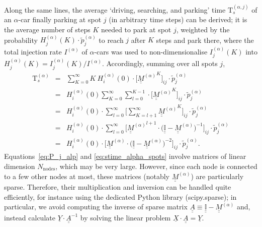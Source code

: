 \documentclass[trsc,reprint]{informs3}
\newcommand{\ul}[1]{\underline{#1}}
\newcommand{\uul}[1]{\underline{\underline{#1}}}
\newcommand{\alp}{^{(\alpha)}}
\newcommand{\Ma}{ {\uul{M}\alp}}
\newcommand{\Tk}{\mathrm{T}_s}
\newcommand{\AN}[1]{#1}
\begin{document}
Along the same lines, the average `driving, searching, and parking' time $\Tk^{(\alpha,j)}$ of an $\alpha$-car finally parking at spot $j$ (in arbitrary time steps) can be derived; it is the average number of steps $K$ needed to park at spot $j$, weighted by the probability $H\alp_j(K)\cdot \tilde{p}\alp_j$ to reach $j$ after $K$ steps and park there, where 
the total injection rate $I\alp$ of $\alpha$-cars was used to non-dimensionalise $I\alp_j(K)$ into $H\alp_j(K)= I\alp_j(K)/I\alp$. Accordingly, summing over all spots $j$,
\begin{eqnarray}
    \Tk^{(\alpha)} & = &\sum_{K=0}^{\infty}  K\ H_i\alp(0) \cdot \Big[\Ma^K\Big]_{ij}\cdot  \tilde{p}\alp_j \nonumber \\
                     & = & H_i\alp(0) \sum_{K=0}^{\infty}  \sum_{l=0}^{K-1}  \cdot \Big[\Ma^K\Big]_{ij}\cdot  \tilde{p}\alp_j \nonumber \\
                     & = & H_i\alp(0) \cdot \sum_{l=0}^{\infty}   \Big[ \sum_{K=l+1}^{\infty}  \Ma^K \Big]_{ij}\cdot  \tilde{p}\alp_j \nonumber \\
                     & = & H_i\alp(0) \cdot \sum_{l=0}^{\infty}   \Big[ \Ma^{l+1}\cdot 
                     \Big(\uul{\mathbb{I}} - \Ma\Big)^{-1}\Big]_{ij}\cdot  \tilde{p}\alp_j \nonumber \\
                      & = & H_i\alp(0) \cdot  \Big[ \Ma\cdot 
                     \Big(\uul{\mathbb{I}} - \Ma\Big)^{-2}\Big]_{ij}\cdot  \tilde{p}\alp_j.
\label{eq:stime_alpha_spots}
\end{eqnarray}
Equations~\ref{eq:P_j_alp} and \ref{eq:stime_alpha_spots} involve matrices of linear dimension $N_{\mathrm{nodes}}$, which may be very large. However, since each node is connected to a few other nodes at most, these matrices (notably $\Ma$) are particularly sparse. Therefore, their multiplication and inversion can be handled quite efficiently, for instance using the dedicated Python library \AN{(scipy.sparse)}; in particular, we avoid computing the inverse of sparse matrix $\uul{A}\equiv \uul{\mathbb{I}} - \Ma$ and, instead calculate $\ul{Y}\cdot \uul{A}^{-1}$ by solving the linear problem $\ul{X}\cdot \uul{A}=\ul{Y}$.
\end{document}
